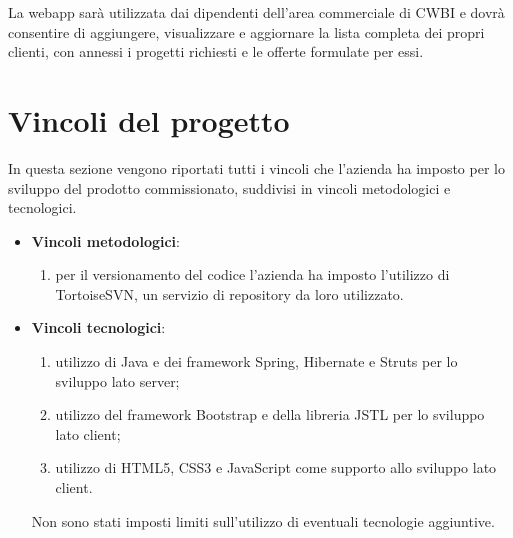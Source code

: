 \noindent La webapp sarà utilizzata dai dipendenti dell'area commerciale di CWBI e dovrà consentire di aggiungere, visualizzare e aggiornare la lista completa dei propri clienti, con annessi i progetti richiesti e le offerte formulate per essi. 

\setlength{\parskip}{3ex}

\section{Vincoli del progetto}
In questa sezione vengono riportati tutti i vincoli che l'azienda ha imposto per lo sviluppo del prodotto commissionato, suddivisi in vincoli metodologici e tecnologici.

\begin{itemize}
\item \textbf{Vincoli metodologici}:
\begin{enumerate}
\item per il versionamento del codice l'azienda ha imposto l'utilizzo di TortoiseSVN, un servizio di repository da loro utilizzato. 
\end{enumerate}

\item \textbf{Vincoli tecnologici}:
\begin{enumerate}
\item utilizzo di Java e dei framework Spring, Hibernate e Struts per lo sviluppo lato server;
\item utilizzo del framework Bootstrap e della libreria JSTL per lo sviluppo lato client;
\item utilizzo di HTML5, CSS3 e JavaScript come supporto allo sviluppo lato client.
\end{enumerate}

Non sono stati imposti limiti sull’utilizzo di eventuali tecnologie aggiuntive.
\end{itemize}

